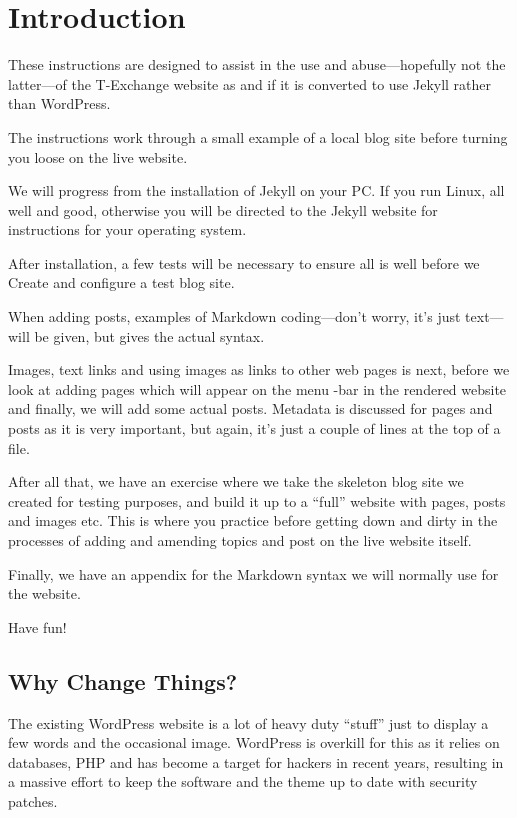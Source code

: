 \chapter{Introduction}\label{chap: Introduction}

These instructions are designed to assist in the use and abuse---hopefully not the latter---of the T-Exchange website as and if it is converted to use Jekyll rather than WordPress.

The instructions work through a small example of a local blog site before turning you loose on the live website.

We will progress from the installation of Jekyll on your PC. If you run Linux, all well and good, otherwise you will be directed to the Jekyll website for instructions for your operating system.

After installation, a few tests will be necessary to ensure all is well before we Create and configure a test blog site.

When adding posts, examples of Markdown coding---don't worry, it's just text---will be given, but  gives the actual syntax.

Images, text links and using images as links to other web pages is next, before we look at adding pages which will appear on the menu -bar in the rendered website and finally, we will add some actual posts. Metadata is discussed for pages and posts as it is very important, but again, it's just a couple of lines at the top of a file.

After all that, we have an exercise where we take the skeleton blog site we created for testing purposes, and build it up to a ``full'' website with pages, posts and images etc. This is where you practice before getting down and dirty in the processes of adding and amending topics and post on the live website itself.

Finally, we have an appendix for the Markdown syntax we will normally use for the website.

Have fun!



\section{Why Change Things?}

The existing WordPress website is a lot of heavy duty ``stuff'' just to display a few words and the occasional image. WordPress is overkill for this as it relies on databases, PHP and has become a target for hackers in recent years, resulting in a massive effort to keep the software and the theme up to date with security patches.

